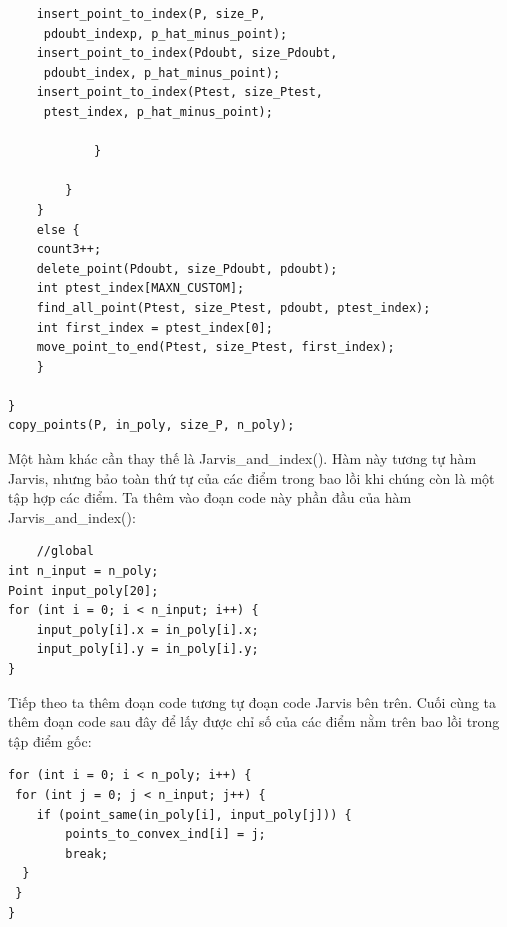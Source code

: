 \documentclass[12pt,a4paper,openany,oneside]{report}
\begin{document}
\begin{lstlisting}
	insert_point_to_index(P, size_P,
	 pdoubt_indexp, p_hat_minus_point);
	insert_point_to_index(Pdoubt, size_Pdoubt,
	 pdoubt_index, p_hat_minus_point);
	insert_point_to_index(Ptest, size_Ptest,
	 ptest_index, p_hat_minus_point);
			
			}
			
		}
	}
	else {
	count3++;
	delete_point(Pdoubt, size_Pdoubt, pdoubt);
	int ptest_index[MAXN_CUSTOM];
	find_all_point(Ptest, size_Ptest, pdoubt, ptest_index);
	int first_index = ptest_index[0];
	move_point_to_end(Ptest, size_Ptest, first_index);
	}
	
}
copy_points(P, in_poly, size_P, n_poly);
\end{lstlisting}

Một hàm khác cần thay thế là Jarvis\_and\_index(). Hàm này tương tự hàm Jarvis, nhưng bảo toàn thứ tự của các điểm trong bao lồi khi chúng còn là một tập hợp các điểm. Ta thêm vào đoạn code này phần đầu của hàm Jarvis\_and\_index():


\begin{lstlisting}
	//global
int n_input = n_poly;
Point input_poly[20];
for (int i = 0; i < n_input; i++) {
	input_poly[i].x = in_poly[i].x;
	input_poly[i].y = in_poly[i].y;
}
\end{lstlisting}
Tiếp theo ta thêm đoạn code tương tự đoạn code Jarvis bên trên. Cuối cùng ta thêm đoạn code sau đây để lấy được chỉ số của các điểm nằm trên bao lồi trong tập điểm gốc:

\begin{lstlisting}
for (int i = 0; i < n_poly; i++) {
 for (int j = 0; j < n_input; j++) {
 	if (point_same(in_poly[i], input_poly[j])) {
		points_to_convex_ind[i] = j;
		break;
  }
 }
}
\end{lstlisting}
\end{document}
